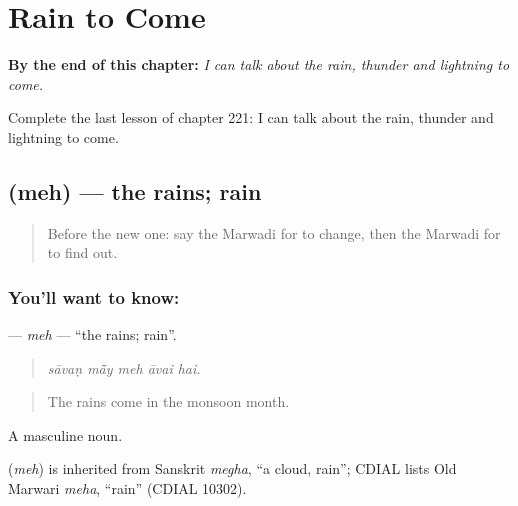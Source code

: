 
\chapter{Rain to Come}
\label{ch:mw-rain-to-come}

\begin{chapteropening}
\textbf{By the end of this chapter:} \emph{I can talk about the rain, thunder and lightning to come.}

Complete the last lesson of chapter 221: I can talk about the rain, thunder and lightning to come.
\end{chapteropening}

\section[\texorpdfstring{\mw{मेह} (meh)}{मेह (meh)}]{ (meh) — the rains; rain}

\label{lesson:MW-C221-meh}



\begin{quote}
Before the new one: say the Marwadi for to change, then the Marwadi for to find out.
\end{quote}

\subsection*{You'll want to know: }
\textbf{} — \emph{meh} — \textquotedblleft{}the rains; rain\textquotedblright{}.

\begin{quote}
    
\end{quote}

\begin{quote}
\emph{sāvaṇ mā̃y meh āvai hai.}
\end{quote}

\begin{quote}
The rains come in the monsoon month.
\end{quote}

A masculine noun.

\begin{cousinweb}
\textbf{} (\emph{meh}) is inherited from Sanskrit \emph{megha}, \textquotedblleft{}a cloud, rain\textquotedblright{}; CDIAL lists Old Marwari \emph{meha}, \textquotedblleft{}rain\textquotedblright{} (CDIAL 10302).
\end{cousinweb}

